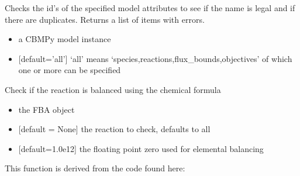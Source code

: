 \documentclass[letterpaper,10pt,english]{sphinxmanual}
\begin{document}
\begin{fulllineitems}
\label{\detokenize{modules_doc:cbmpy.CBTools.checkIds}}
\pysigstartsignatures
{}
\pysigstopsignatures
\sphinxAtStartPar
Checks the id’s of the specified model attributes to see if the name is legal and if there are duplicates.
Returns a list of items with errors.
\begin{itemize}
\item {} 
\sphinxAtStartPar
{} a CBMPy model instance

\item {} 
\sphinxAtStartPar
{} {[}default=’all’{]} ‘all’ means ‘species,reactions,flux\_bounds,objectives’ of which one or more can be specified

\end{itemize}

\end{fulllineitems}


\begin{fulllineitems}
\label{\detokenize{modules_doc:cbmpy.CBTools.checkReactionBalanceElemental}}
\pysigstartsignatures
{}
\pysigstopsignatures
\sphinxAtStartPar
Check if the reaction is balanced using the chemical formula
\begin{itemize}
\item {} 
\sphinxAtStartPar
{} the FBA object

\item {} 
\sphinxAtStartPar
{} {[}default = None{]} the reaction to check, defaults to all

\item {} 
\sphinxAtStartPar
{} {[}default=1.0e\sphinxhyphen{}12{]} the floating point zero used for elemental balancing

\end{itemize}

\sphinxAtStartPar
This function is derived from the code found here: 

\end{fulllineitems}
\end{document}
